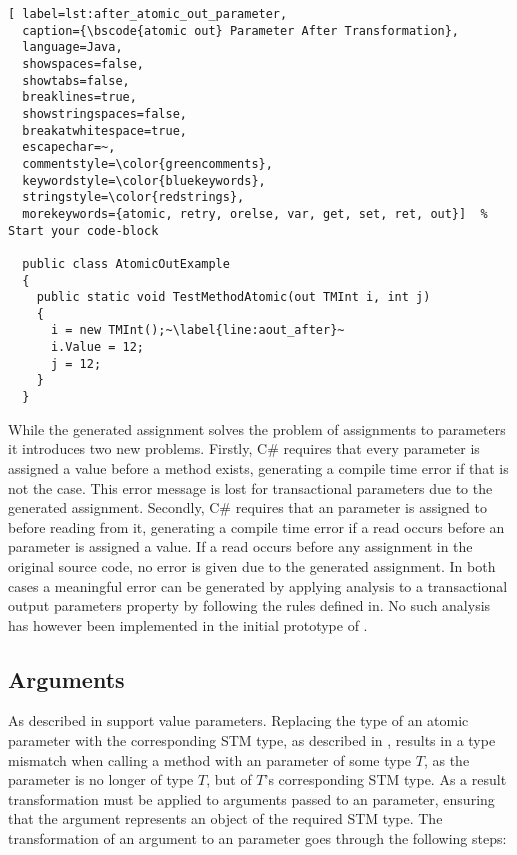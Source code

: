 \begin{lstlisting}[ label=lst:after_atomic_out_parameter,
  caption={\bscode{atomic out} Parameter After Transformation},
  language=Java,  
  showspaces=false,
  showtabs=false,
  breaklines=true,
  showstringspaces=false,
  breakatwhitespace=true,
  escapechar=~,
  commentstyle=\color{greencomments},
  keywordstyle=\color{bluekeywords},
  stringstyle=\color{redstrings},
  morekeywords={atomic, retry, orelse, var, get, set, ret, out}]  % Start your code-block

  public class AtomicOutExample
  {
    public static void TestMethodAtomic(out TMInt i, int j)
    {
      i = new TMInt();~\label{line:aout_after}~
      i.Value = 12;
      j = 12;
    }
  }
\end{lstlisting}

While the generated assignment solves the problem of assignments to  parameters it introduces two new problems. Firstly, C\# requires that every  parameter is assigned a value before a method exists, generating a compile time error if that is not the case\cite[p. 94]{csharp2013specificaiton}. This error message is lost for transactional  parameters due to the generated assignment. Secondly, C\# requires that an  parameter is assigned to before reading from it\cite[p. 94]{csharp2013specificaiton}, generating a compile time error if a read occurs before an  parameter is assigned a value. If a read occurs before any assignment in the original source code, no error is given due to the generated assignment. In both cases a meaningful error can be generated by applying analysis to a transactional output parameters  property by following the rules defined in\cite[p. 95]{csharp2013specificaiton}. No such analysis has however been implemented in the initial prototype of \stmname.

\subsection{Arguments}
As described in  \stmnamesp support value parameters. Replacing the type of an atomic parameter with the corresponding \ac{STM} type, as described in , results in a type mismatch when calling a method with an  parameter of some type $T$, as the parameter is no longer of type $T$, but of $T$'s corresponding \ac{STM} type. As a result transformation must be applied to arguments passed to an  parameter, ensuring that the argument represents an object of the required \ac{STM} type. The transformation of an argument to an  parameter goes through the following steps:

